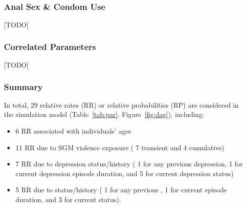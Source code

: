\subsubsection{Anal Sex \& Condom Use}
[TODO]
\subsubsection{Correlated Parameters}
[TODO]
\subsubsection{Summary}\label{mod.par.evt.sum}
In total, 29 relative rates (RR) or relative probabilities (RP) are considered
in the simulation model (Table~\ref{tab:par}, Figure~\ref{fig:dag}), including:
\begin{itemize}
  \item 6 RR associated with individuals' ages
  \item 11 RR due to SGM violence exposure (%
    7 transient and 4 cumulative)
  \item 7 RR due to depression status/history (%
    1 for any previous depression,
    1 for current depression episode duration, and
    5 for current depression status)
  \item 5 RR due to \hazdrink status/history (%
    1 for any previous \hazdrink,
    1 for current \hazdrink episode duration, and
    3 for current \hazdrink status).
\end{itemize}
